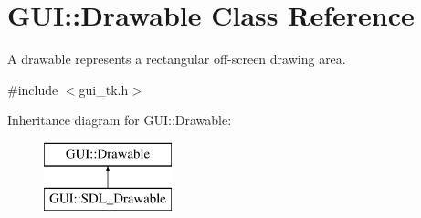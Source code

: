 \hypertarget{classGUI_1_1Drawable}{\section{G\-U\-I\-:\-:Drawable Class Reference}
\label{classGUI_1_1Drawable}
}


A drawable represents a rectangular off-\/screen drawing area.  




{\ttfamily \#include $<$gui\-\_\-tk.\-h$>$}

Inheritance diagram for G\-U\-I\-:\-:Drawable\-:\begin{figure}[H]
\begin{center}
\leavevmode
\includegraphics[height=2.000000cm]{classGUI_1_1Drawable}
\end{center}
\end{figure}

